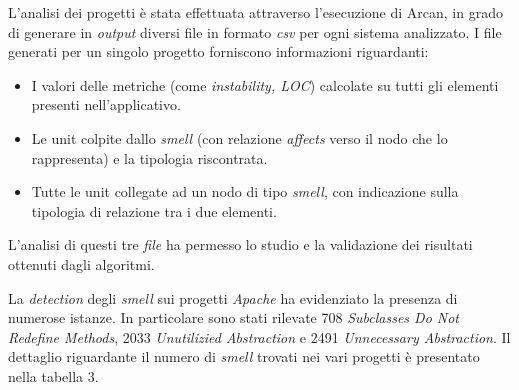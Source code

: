 L'analisi dei progetti è stata effettuata attraverso l'esecuzione di Arcan, in grado di generare in \textit{output} diversi file in formato \textit{csv} per ogni sistema analizzato. I file generati per un singolo progetto forniscono informazioni riguardanti:
\begin{itemize}
    \item I valori delle metriche (come \textit{instability, LOC}) calcolate su tutti gli elementi presenti nell'applicativo.
    
    \item Le unit colpite dallo \textit{smell} (con relazione \textit{affects} verso il nodo che lo rappresenta) e la tipologia riscontrata.
    
    \item Tutte le unit collegate ad un nodo di tipo \textit{smell}, con indicazione sulla tipologia di relazione tra i due elementi.
\end{itemize}
L'analisi di questi tre \textit{file} ha permesso lo studio e la validazione dei risultati ottenuti dagli algoritmi.

La \textit{detection} degli \textit{smell} sui progetti \textit{Apache} ha evidenziato la presenza di numerose istanze. In particolare sono stati rilevate 708 \textit{Subclasses Do Not Redefine Methods}, 2033 \textit{Unutilizied Abstraction} e 2491 \textit{Unnecessary Abstraction}. Il dettaglio riguardante il numero di \textit{smell} trovati nei vari progetti è presentato nella tabella 3. 

